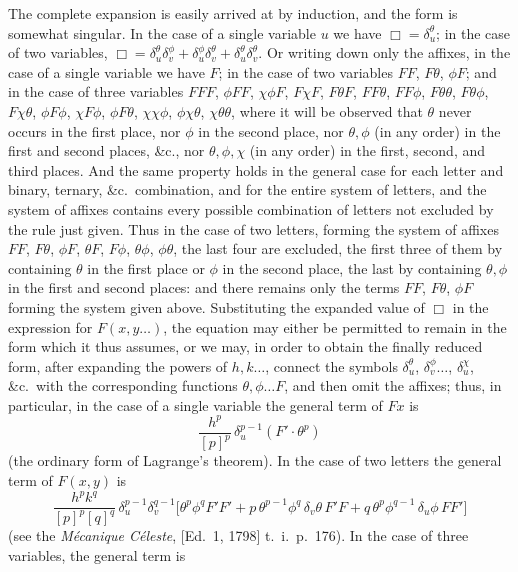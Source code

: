 \documentclass[11pt]{article}
\begin{document}
The complete expansion is easily arrived at by induction, and the form is somewhat singular. In the case of a single variable $u$ we have $\Box = \delta_u^\theta$; in the case of two variables, $\Box = \delta_u^\theta\delta_v^\phi + \delta_u^\phi\delta_v^\theta + \delta_u^\theta\delta_v^\theta$. Or writing down only the affixes, in the case of a single variable we have $F$; in the case of two variables $FF$, $F\theta$, $\phi F$; and in the case of three variables $FFF$, $\phi FF$, $\chi\phi F$, $F\chi F$, $F\theta F$, $FF\theta$, $FF\phi$, $F\theta\theta$, $F\theta\phi$, $F\chi\theta$, $\phi F\phi$, $\chi F\phi$, $\phi F\theta$, $\chi\chi\phi$, $\phi\chi\theta$, $\chi\theta\theta$, where it will be observed that $\theta$ never occurs in the first place, nor $\phi$ in the second place, nor $\theta,\phi$ (in any order) in the first and second places, \&c., nor $\theta,\phi,\chi$ (in any order) in the first, second, and third places. And the same property holds in the general case for each letter and binary, ternary, \&c.\ combination, and for the entire system of letters, and the system of affixes contains every possible combination of letters not excluded by the rule just given. Thus in the case of two letters, forming the system of affixes $FF$, $F\theta$, $\phi F$, $\theta F$, $F\phi$, $\theta\phi$, $\phi\theta$, the last four are excluded, the first three of them by containing $\theta$ in the first place or $\phi$ in the second place, the last by containing $\theta,\phi$ in the first and second places: and there remains only the terms $FF$, $F\theta$, $\phi F$ forming the system given above. Substituting the expanded value of $\Box$ in the expression for $F(x,y\ldots)$, the equation may either be permitted to remain in the form which it thus assumes, or we may, in order to obtain the finally reduced form, after expanding the powers of $h,k\ldots$, connect the symbols $\delta_u^\theta$, $\delta_v^\phi\ldots$, $\delta_u^\chi$, \&c.\ with the corresponding functions $\theta,\phi\ldots F$, and then omit the affixes; thus, in particular, in the case of a single variable the general term of $F x$ is
\[ \frac{h^p}{[p]^p}\,\delta_u^{p-1}(F'\!\cdot\!\theta^p) \]
(the ordinary form of Lagrange's theorem). In the case of two letters the general term of $F(x,y)$ is
\[ \frac{h^p k^q}{[p]^p[q]^q}\,\delta_u^{p-1}\delta_v^{q-1}\bigl[\theta^p\phi^q F'F' + p\,\theta^{p-1}\phi^q\,\delta_v\theta\,F'F + q\,\theta^p\phi^{q-1}\,\delta_u\phi\,FF'\bigr] \]
(see the \emph{M\'{e}canique C\'{e}leste}, [Ed.\ 1, 1798] t.\ i.\ p.\ 176). In the case of three variables, the general term is
\end{document}
